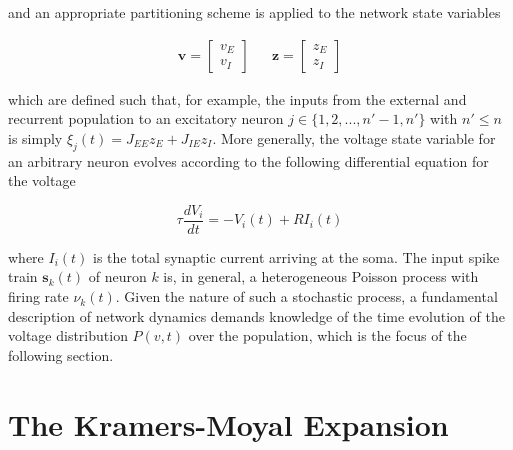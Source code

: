 \documentclass{ucetd}
\begin{document}
and an appropriate partitioning scheme is applied to the network state variables

\begin{align}
\mathbf{v} = \begin{bmatrix}
    v_{E}\\
    v_{I} 
\end{bmatrix}  && \mathbf{z} = \begin{bmatrix}
    z_{E}\\
    z_{I} 
\end{bmatrix} 
\end{align}

which are defined such that, for example, the inputs from the external and recurrent population to an excitatory neuron $j \in \{1, 2, ..., n'-1, n'\}$ with $n' \leq n$ is simply $\xi_{j}(t) = J_{EE}z_{E} + J_{IE}z_{I}$. More generally, the voltage state variable for an arbitrary neuron evolves according to the following differential equation for the voltage

\begin{equation*}
\tau\frac{dV_{i}}{dt} = -V_{i}(t) + RI_{i}(t)
\end{equation*}

where $I_{i}(t)$ is the total synaptic current arriving at the soma. The input spike train $\mathbf{s}_{k}(t)$ of neuron $k$ is, in general, a heterogeneous Poisson process with firing rate $\nu_{k}(t)$. Given the nature of such a stochastic process, a fundamental description of network dynamics demands knowledge of the time evolution of the voltage distribution $P(v,t)$ over the population, which is the focus of the following section.

\section{The Kramers-Moyal Expansion}
\end{document}
